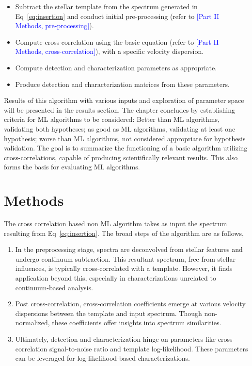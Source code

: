 \begin{itemize}
    \item 
    Subtract the stellar template from the spectrum generated in Eq~\ref{eq:insertion} and conduct initial pre-processing (refer to \textcolor{blue}{[Part II Methods, pre-processing]}).
    \item
    Compute cross-correlation using the basic equation (refer to \textcolor{blue}{[Part II Methods, cross-correlation]}), with a specific velocity dispersion.
    \item 
    Compute detection and characterization parameters as appropriate.
    \item 
    Produce detection and characterization matrices from these parameters.
\end{itemize}

Results of this algorithm with various inputs and exploration of parameter space will be presented in the results section. The chapter concludes by establishing criteria for ML algorithms to be considered: Better than ML algorithms, validating both hypotheses; as good as ML algorithms, validating at least one hypothesis; worse than ML algorithms, not considered appropriate for hypothesis validation.
The goal is to summarize the functioning of a basic algorithm utilizing cross-correlations, capable of producing scientifically relevant results. This also forms the basis for evaluating ML algorithms.

\section{Methods}
The cross correlation based non ML algorithm takes as input the spectrum resulting from Eq~\ref{eq:insertion}.
The broad steps of the algorithm are as follows,

\begin{enumerate}
    \item In the preprocessing stage, spectra are deconvolved from stellar features and undergo continuum subtraction. This resultant spectrum, free from stellar influences, is typically cross-correlated with a template. However, it finds application beyond this, especially in characterizations unrelated to continuum-based analysis.

\item Post cross-correlation, cross-correlation coefficients emerge at various velocity dispersions between the template and input spectrum. Though non-normalized, these coefficients offer insights into spectrum similarities.

\item Ultimately, detection and characterization hinge on parameters like cross-correlation signal-to-noise ratio and template log-likelihood. These parameters can be leveraged for log-likelihood-based characterizations.
\end{enumerate}
